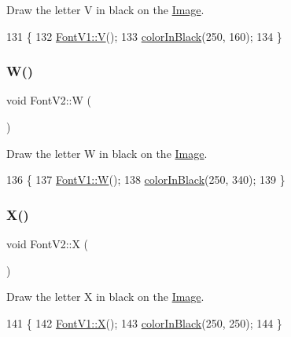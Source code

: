 Draw the letter V in black on the \mbox{\hyperlink{class_image}{Image}}. 


\begin{DoxyCode}
131                \{
132     \mbox{\hyperlink{class_font_v1_aa5937063bd49c25ccd8993d375926fb7}{FontV1::V}}();
133     \mbox{\hyperlink{class_font_v2_a04f2501961bc286ce70fbb6a840b0e8a}{colorInBlack}}(250, 160);
134 \}
\end{DoxyCode}
\mbox{\label{class_font_v2_abb6c182459f9a1a20c4d6a85d09b1b1d}} 
\subsubsection{\texorpdfstring{W()}{W()}}
{\footnotesize\ttfamily void Font\+V2\+::W (\begin{DoxyParamCaption}{ }\end{DoxyParamCaption})}



Draw the letter W in black on the \mbox{\hyperlink{class_image}{Image}}. 


\begin{DoxyCode}
136                \{
137     \mbox{\hyperlink{class_font_v1_aa4e67840b676dfffd3e03d873013174c}{FontV1::W}}();
138     \mbox{\hyperlink{class_font_v2_a04f2501961bc286ce70fbb6a840b0e8a}{colorInBlack}}(250, 340);
139 \}
\end{DoxyCode}
\mbox{\label{class_font_v2_a63545ba2652b9559d8d171c5bd37fbea}} 
\subsubsection{\texorpdfstring{X()}{X()}}
{\footnotesize\ttfamily void Font\+V2\+::X (\begin{DoxyParamCaption}{ }\end{DoxyParamCaption})}



Draw the letter X in black on the \mbox{\hyperlink{class_image}{Image}}. 


\begin{DoxyCode}
141                \{
142     \mbox{\hyperlink{class_font_v1_a8a93144edcf0f9bf1ac9017eb916ff82}{FontV1::X}}();
143     \mbox{\hyperlink{class_font_v2_a04f2501961bc286ce70fbb6a840b0e8a}{colorInBlack}}(250, 250);
144 \}
\end{DoxyCode}
\mbox{\label{class_font_v2_a858b25a33231fe1a78539d040e59f0ee}} 

